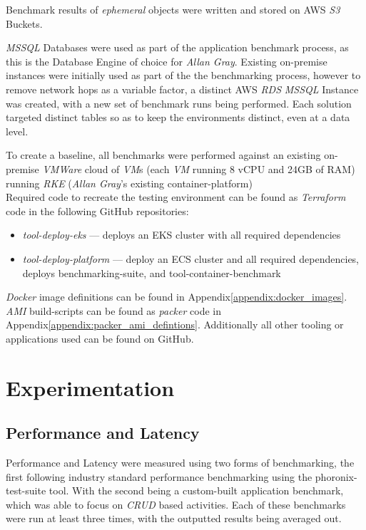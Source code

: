 Benchmark results of \emph{ephemeral} objects were written and stored on AWS \emph{S3} Buckets.

\emph{MSSQL} Databases were used as part of the application benchmark process, as this is the Database Engine of choice for \emph{Allan Gray}.
Existing on-premise instances were initially used as part of the the benchmarking process, however to remove network hops as a variable factor,
a distinct AWS \emph{RDS} \emph{MSSQL} Instance was created, with a new set of benchmark runs being performed.
Each solution targeted distinct tables so as to keep the environments distinct, even at a data level.

To create a baseline, all benchmarks were performed against an existing on-premise \emph{VMWare} cloud of \emph{VM}s (each \textit{VM} running 8 vCPU and 24GB of RAM) running \emph{RKE} (\emph{Allan Gray}'s existing container-platform) \\

\noindent Required code to recreate the testing environment can be found as \emph{Terraform} code in the following GitHub repositories:
\begin{itemize}
      \item \emph{tool-deploy-eks}\cite{thameezb_2022} --- deploys an EKS cluster with all required dependencies
      \item \emph{tool-deploy-platform}\cite{thameezb} --- deploy an ECS cluster and all required dependencies, deploys benchmarking-suite, and tool-container-benchmark
\end{itemize}
\emph{Docker} image definitions can be found in Appendix\ref{appendix:docker_images}.
\emph{AMI} build-scripts can be found as \emph{packer} code in Appendix\ref{appendix:packer_ami_defintions}.
Additionally all other tooling or applications used can be found on GitHub\cite{bodhanya_2022}.

\chapter{Experimentation}
\section{Performance and Latency}
Performance and Latency were measured using two forms of benchmarking, the first following industry standard performance benchmarking using the phoronix-test-suite\cite{phoronix_test_suite} tool.
With the second being a custom-built application benchmark, which was able to focus on \emph{CRUD} based activities.
Each of these benchmarks were run at least three times, with the outputted results being averaged out.

